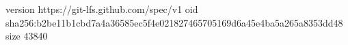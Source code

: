 version https://git-lfs.github.com/spec/v1
oid sha256:b2be11b1cbd7a4a36585ec5f4e021827465705169d6a45e4ba5a265a8353dd48
size 43840
